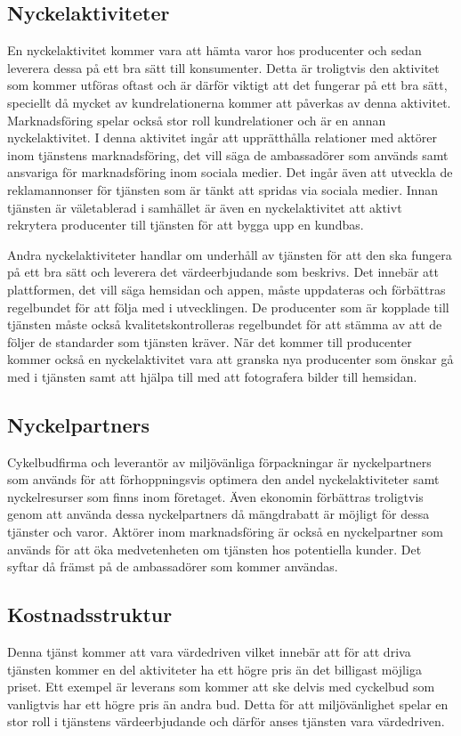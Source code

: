 \documentclass[10pt,a4paper,oneside]{article}
\begin{document}
\subsection{Nyckelaktiviteter}
En nyckelaktivitet kommer vara att hämta varor hos producenter och sedan leverera dessa på ett bra sätt till konsumenter. Detta är troligtvis den aktivitet som kommer utföras oftast och är därför viktigt att det fungerar på ett bra sätt, speciellt då mycket av kundrelationerna kommer att påverkas av denna aktivitet. Marknadsföring spelar också stor roll kundrelationer och är en annan nyckelaktivitet. I denna aktivitet ingår att upprätthålla relationer med aktörer inom tjänstens marknadsföring, det vill säga de ambassadörer som används samt ansvariga för marknadsföring inom sociala medier. Det ingår även att utveckla de reklamannonser för tjänsten som är tänkt att spridas via sociala medier. Innan tjänsten är väletablerad i samhället är även en nyckelaktivitet att aktivt rekrytera producenter till tjänsten för att bygga upp en kundbas.  

Andra nyckelaktiviteter handlar om underhåll av tjänsten för att den ska fungera på ett bra sätt och leverera det värdeerbjudande som beskrivs. Det innebär att plattformen, det vill säga hemsidan och appen, måste uppdateras och förbättras regelbundet för att följa med i utvecklingen. De producenter som är kopplade till tjänsten måste också kvalitetskontrolleras regelbundet för att stämma av att de följer de standarder som tjänsten kräver. När det kommer till producenter kommer också en nyckelaktivitet vara att granska nya producenter som önskar gå med i tjänsten samt att hjälpa till med att fotografera bilder till hemsidan. 

\subsection{Nyckelpartners}
Cykelbudfirma och leverantör av miljövänliga förpackningar är nyckelpartners som används för att förhoppningsvis optimera den andel nyckelaktiviteter samt nyckelresurser som finns inom företaget. Även ekonomin förbättras troligtvis genom att använda dessa nyckelpartners då mängdrabatt är möjligt för dessa tjänster och varor. Aktörer inom marknadsföring är också en nyckelpartner som används för att öka medvetenheten om tjänsten hos potentiella kunder. Det syftar då främst på de ambassadörer som kommer användas. 

\subsection{Kostnadsstruktur}
Denna tjänst kommer att vara värdedriven vilket innebär att för att driva tjänsten kommer en del aktiviteter ha ett högre pris än det billigast möjliga priset. Ett exempel är leverans som kommer att ske delvis med cyckelbud som vanligtvis har ett högre pris än andra bud. Detta för att miljövänlighet spelar en stor roll i tjänstens värdeerbjudande och därför anses tjänsten vara värdedriven. 
\end{document}
